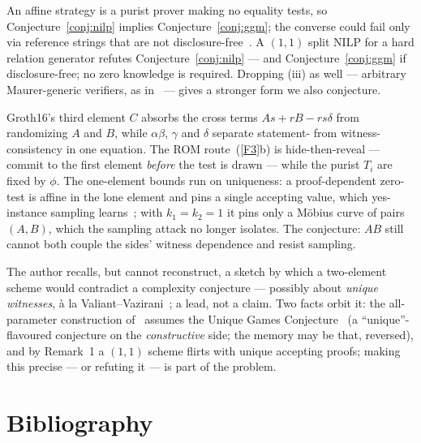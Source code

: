\documentclass{conjura-conjecture}
\begin{document}
\noindent
An affine strategy is a purist prover making no equality tests, so
Conjecture~\ref{conj:nilp} implies Conjecture~\ref{conj:ggm}; the
converse could fail only via reference strings that are not
disclosure-free~\cite[Def.~4, Lemma~1]{Gro16}.  A $(1,1)$ split
NILP for a hard relation generator refutes
Conjecture~\ref{conj:nilp} --- and Conjecture~\ref{conj:ggm} if
disclosure-free; no zero knowledge is required.  Dropping (iii) as
well --- arbitrary Maurer-generic verifiers, as in~\cite{ADY25} ---
gives a stronger form we also conjecture.

\begin{remark}
Groth16's third element $C$ absorbs the cross terms
$As + rB - rs\delta$ from randomizing $A$ and $B$, while
$\alpha\beta$, $\gamma$ and $\delta$ separate statement- from
witness-consistency in one equation.  The ROM
route~\textup{(\ref{F3}b)} is hide-then-reveal --- commit to the
first element \emph{before} the test is drawn --- while the purist
$T_i$ are fixed by $\phi$.  The one-element bounds run on
uniqueness: a proof-dependent zero-test is affine in the lone
element and pins a single accepting value, which yes-instance
sampling learns~\cite{Gro16,ADY25}; with $k_1 = k_2 = 1$ it pins
only a M\"obius curve of pairs $(A,B)$, which the sampling attack no
longer isolates.  The conjecture: $AB$ still cannot both couple the
sides' witness dependence and resist sampling.
\end{remark}

\begin{remark}
The author recalls, but cannot reconstruct, a sketch by which a
two-element scheme would contradict a complexity conjecture ---
possibly about \emph{unique witnesses}, \`a la
Valiant--Vazirani~\cite{VV86}; a lead, not a claim.  Two facts orbit
it: the all-parameter construction of~\cite{ADY25} assumes the
Unique Games Conjecture~\cite{Kho02} (a ``unique''-flavoured
conjecture on the \emph{constructive} side; the memory may be that,
reversed), and by Remark~1 a $(1,1)$ scheme flirts with unique
accepting proofs; making this precise --- or refuting it --- is part
of the problem.
\end{remark}

\section{Bibliography}
\end{document}
